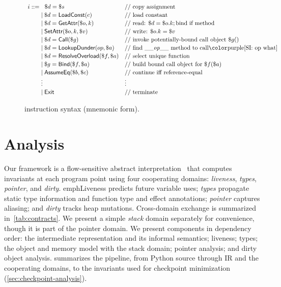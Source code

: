 
\begin{figure}[t]
\centering
\[
\renewcommand{\arraystretch}{1.15}
\begin{array}{l@{}ll}
i ::= \;&\hspace{6pt} \$d = \$s & \text{// copy assignment} \\
      &\mid \$d = \tLoadConst(c) & \text{// load constant} \\
      &\mid \$d = \tGetAttr(\$o, k) & \text{// read: } \$d = \$o.k; \text{bind if method} \\
      &\mid \tSetAttr(\$o, k, \$v) & \text{// write: } \$o.k = \$v \\
      &\mid \$d = \mathsf{Call}(\$g) & \text{// invoke potentially-bound call object } \$g() \\
      &\mid \$d = \tLookupDunder(op, \$a)  & \text{// find \_\_\textit{op}\_\_ method to call\si{op what}} \\
      &\mid \$d = \tResolveOverload(\$f, \$a) & \text{// select unique function} \\
      &\mid \$g = \tBind(\$f, \$a) & \text{// build bound call object for } \$f(\$a) \\
      &\mid \tAssumeEq(\$b, \$c) & \text{// continue iff reference-equal} \\
      & \vdots & \vdots \\
      &\mid \tExit & \text{// terminate}
\end{array}
\]
\caption{\spytecode instruction syntax (mnemonic form).}
\label{fig:tac-syntax-reduced}
\end{figure}

\section{Analysis}
\label{sec:analysis}

Our framework is a flow-sensitive abstract interpretation~\cite{cousot1977abstract} that computes invariants at each program point using four cooperating domains: \emph{liveness}, \emph{types}, \emph{pointer}, and \emph{dirty}. 
emph{Liveness} predicts future variable uses; \emph{types} propagate static type information and function type and effect annotations; \emph{pointer} captures aliasing; and \emph{dirty} tracks heap mutations. Cross-domain exchange is summarized in~\cref{tab:contracts}. We present a simple \emph{stack} domain separately for convenience, though it is part of the pointer domain.
We present components in dependency order: the intermediate representation and its informal semantics; liveness; types; the object and memory model with the stack domain; pointer analysis; and dirty object analysis.  summarizes the pipeline, from Python source through IR and the cooperating domains, to the invariants used for checkpoint minimization (\cref{sec:checkpoint-analysis}).

